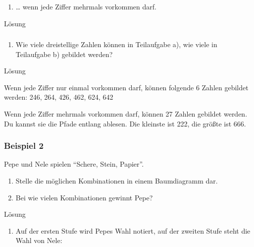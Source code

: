\documentclass[
  ngerman,
]{book}
\providecommand{\tightlist}{%
  \setlength{\itemsep}{0pt}\setlength{\parskip}{0pt}}
\begin{document}
\begin{enumerate}
\def\labelenumi{\alph{enumi})}
\setcounter{enumi}{1}
\tightlist
\item
  \ldots{} wenn jede Ziffer mehrmals vorkommen darf.
\end{enumerate}

Lösung

\hypertarget{section-103}{%
\subsubsection*{}\label{section-103}}

\begin{enumerate}
\def\labelenumi{\alph{enumi})}
\setcounter{enumi}{2}
\tightlist
\item
  Wie viele dreistellige Zahlen können in Teilaufgabe a), wie viele in Teilaufgabe b) gebildet werden?
\end{enumerate}

Lösung

Wenn jede Ziffer nur einmal vorkommen darf, können folgende 6 Zahlen gebildet werden: 246, 264, 426, 462, 624, 642

Wenn jede Ziffer mehrmals vorkommen darf, können 27 Zahlen gebildet werden. Du kannst sie die Pfade entlang ablesen. Die kleinste ist 222, die größte ist 666.

\hypertarget{section-104}{%
\subsubsection*{}\label{section-104}}

\hypertarget{beispiel-2}{%
\subsubsection*{Beispiel 2}\label{beispiel-2}}

Pepe und Nele spielen ``Schere, Stein, Papier''.

\begin{enumerate}
\def\labelenumi{\alph{enumi})}
\item
  Stelle die möglichen Kombinationen in einem Baumdiagramm dar.
\item
  Bei wie vielen Kombinationen gewinnt Pepe?
\end{enumerate}

Lösung

\begin{enumerate}
\def\labelenumi{\alph{enumi})}
\tightlist
\item
  Auf der ersten Stufe wird Pepes Wahl notiert, auf der zweiten Stufe steht die Wahl von Nele:
\end{enumerate}
\end{document}

